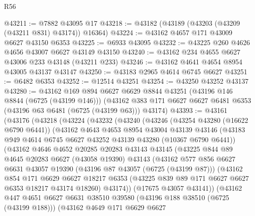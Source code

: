 \begin{lexlean}{R56}
\begin{coremodule}
@43211 := @7882 @43095 @17
@43218 := @43182 (@43189 (@43203 (@43209 (@43211 @831) @43174)) @16364)
@43224 := @43162 @4657 @171 @43009 @6627 @43150 @6353
@43225 := @6933 @43095
@43232 := @43225 @260 @4626 @4656 @43007 @6627 @43149 @43150
@43240 := @43162 @234 @4655 @6627 @43006 @233 @43148 (@43211 @233)
@43246 := @43162 @4641 @4654 @8954 @43005 @43137 @43147
@43250 := @43183 @2965 @4614 @6745 @6627
@43251 := @6482 @6353
@43252 := @12514 @43251
@43254 := @43250 @43252 @43137
@43280 := @43162
    @169
    @894
    @6627
    @6629
    @8844
    @43251
    (@43196 @146 @8844 (@6725 (@43199 @146)))
    (@43162 @383 @171 @6627 @6627 @6481 @6353 (@43196 @63 @6481 (@6725 (@43199 @63))) @43174)
@43393 := @43161
    (@43176
      (@43218
        (@43224
          (@43232
            (@43240
              (@43246
                (@43254 @43280 (@16622 @6790 @6441))
                (@43162
                  @4643
                  @4653
                  @8954
                  @43004
                  @43139
                  @43146
                  (@43183 @949 @4614 @6745 @6627 @43252 @43139 @43280 (@10367 @6790 @6441))
                  (@43162
                    @4646
                    @4652
                    @20285
                    @20283
                    @43143
                    @43145
                    (@43225
                      @844
                      @89
                      @4645
                      @20283
                      @6627
                      (@43058 @19390)
                      @43143
                      (@43162
                        @577
                        @856
                        @6627
                        @6631
                        @43057
                        @19390
                        (@43196 @87 @43057 (@6725 (@43199 @87)))
                        (@43162
                          @854
                          @171
                          @6629
                          @6627
                          @18217
                          @6353
                          (@43225 @839 @89 @171 @6627 @6627 @6353 @18217 @43174 @18260)
                          @43174))
                      (@17675 @43057 @43141))
                    (@43162
                      @447
                      @4651
                      @6627
                      @6631
                      @38510
                      @39580
                      (@43196 @188 @38510 (@6725 (@43199 @188)))
                      (@43162
                        @4649
                        @171
                        @6629
                        @6627

\end{coremodule}
\end{lexlean}
